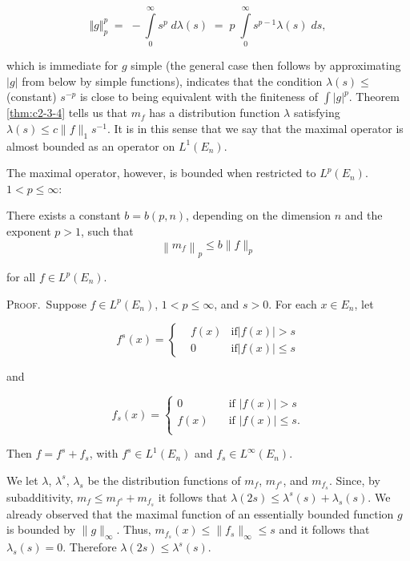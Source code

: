 \begin{equation}\label{eq:c2-3-6}
\Vert g\Vert_{p}^{p}\;=\;-\int\limits_{0}^{\infty}s^{p}\;d\lambda(s)\;=\;p\;\int\limits_{0}^{\infty}s^{p-1}\lambda(s)\;d s,
\end{equation}

which is immediate for $g$ simple (the general case then follows by approximating $|g|$ from below by simple functions), indicates that the condition $\lambda(s) \leq$ (constant) $s^{-p}$ is close to being equivalent with the finiteness of $\int |g|^{p}$. Theorem \ref{thm:c2-3-4} tells us that $m_f$ has a distribution function $\lambda$ satisfying $\lambda(s) \leq c \|f\|_1 s^{-1}$. It is in this sense that we say that the maximal operator is almost bounded as an operator on $L^1(E_n)$.

The maximal operator, however, is bounded when restricted to $L^p(E_n)$. $1 < p \leq \infty$:

\begin{theorem}
\label{thm:c2-3-7}
There exists a constant $b = b(p, n)$, depending on the dimension $n$ and the exponent $p > 1$, such that
\[
\left\|m_{f}\right\|_{p}\leq b\|f\|_{p}
\]

for all $f \in L^{p}(E_{n})$.
\end{theorem}

\textsc{Proof.}\ Suppose $f \in L^p(E_n)$, $1 < p \leq \infty$, and $s > 0$. For each $x \in E_n$, let

\[
f^{s}(x)=\left\{\begin{aligned}&f(x)&\text{if}|f(x)|>s\\ &0&\text{if}|f(x)|\leq s\end{aligned}\right.
\]

and

\[
f_{s}(x)=\left\{\begin{matrix}{0}&{\quad\text{if }|f(x)|>s}\\ {f(x)}&{\quad\text{if }|f(x)|\leq s.}\\ \end{matrix}\right.
\]

Then $f = f^s + f_s$, with $f^s \in L^1(E_n)$ and $f_s \in L^\infty(E_n)$.

We let $\lambda$, $\lambda^{s}$, $\lambda_{s}$ be the distribution functions of $m_{f}$, $m_{f^{s}}$, and $m_{f_{s}}$. Since, by subadditivity, $m_{f} \leq m_{f^{s}} + m_{f_{s}}$ it follows that $\lambda(2s) \leq \lambda^{s}(s) + \lambda_{s}(s)$. We already observed that the maximal function of an essentially bounded function $g$ is bounded by $\|g\|_{\infty}$. Thus, $m_{f_{s}}(x) \leq \|f_{s}\|_{\infty} \leq s$ and it follows that $\lambda_{s}(s) = 0$. Therefore $\lambda(2s) \leq \lambda^{s}(s)$.

